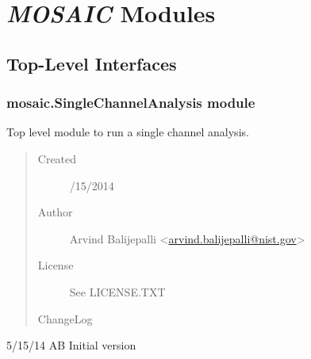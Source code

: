 \documentclass[letterpaper,10pt,english]{sphinxmanual}
\begin{document}
\section{\emph{MOSAIC} Modules}
\label{doc/apidocs:projname-modules}

\subsection{Top-Level Interfaces}
\label{api-doc/mosaic:top-level-interfaces}\label{api-doc/mosaic::doc}

\subsubsection{mosaic.SingleChannelAnalysis module}
\label{api-doc/mosaic:module-mosaic.SingleChannelAnalysis}\label{api-doc/mosaic:mosaic-singlechannelanalysis-module}
Top level module to run a single channel analysis.
\begin{quote}\begin{description}
\item[{Created}] /15/2014

\item[{Author}] \leavevmode
Arvind Balijepalli \textless{}\href{mailto:arvind.balijepalli@nist.gov}{arvind.balijepalli@nist.gov}\textgreater{}

\item[{License}] \leavevmode
See LICENSE.TXT

\item[{ChangeLog}] \leavevmode
\end{description}\end{quote}

\begin{DUlineblock}{0em}
\item[] 5/15/14         AB      Initial version
\end{DUlineblock}
\end{document}
